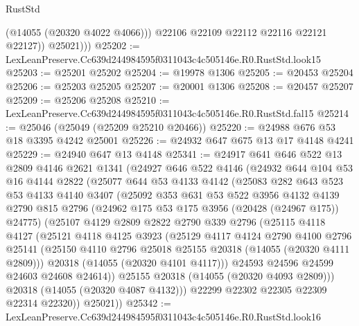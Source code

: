 \begin{lexlean}{RustStd}
\begin{coremodule}
                (@14055 (@20320 @4022 @4066)))
              @22106
              @22109
              @22112
              @22116
              @22121
              @22127))
          @25021)))
@25202 := LexLeanPreserve.Cc639d244984595f0311043c4c505146e.R0.RustStd.look15
@25203 := @25201 @25202
@25204 := @19978 @1306
@25205 := @20453 @25204
@25206 := @25203 @25205
@25207 := @20001 @1306
@25208 := @20457 @25207
@25209 := @25206 @25208
@25210 := LexLeanPreserve.Cc639d244984595f0311043c4c505146e.R0.RustStd.fal15
@25214 := @25046 (@25049 (@25209 @25210 @20466))
@25220 := @24988 @676 @53 @18 @3395 @4242 @25001
@25226 := @24932 @647 @675 @13 @17 @4148 @4241
@25229 := @24940 @647 @13 @4148
@25341 := @24917
    @641
    @646
    @522
    @13
    @2809
    @4146
    @2621
    @1341
    (@24927
      @646
      @522
      @4146
      (@24932
        @644
        @104
        @53
        @16
        @4144
        @2822
        (@25077
          @644
          @53
          @4133
          @4142
          (@25083
            @282
            @643
            @523
            @53
            @4133
            @4140
            @3407
            (@25092
              @353
              @631
              @53
              @522
              @3956
              @4132
              @4139
              @2790
              @815
              @2796
              (@24962 @175 @53 @175 @3956 (@20428 (@24967 @175)) @24775)
              (@25107
                @4129
                @2809
                @2822
                @2790
                @339
                @2796
                (@25115
                  @4118
                  @4127
                  (@25121
                    @4118
                    @4125
                    @3923
                    (@25129
                      @4117
                      @4124
                      @2790
                      @4100
                      @2796
                      @25141
                      (@25150 @4110 @2796 @25018 @25155 @20318 (@14055 (@20320 @4111 @2809)))
                      @20318
                      (@14055 (@20320 @4101 @4117)))
                    @24593
                    @24596
                    @24599
                    @24603
                    @24608
                    @24614))
                @25155
                @20318
                (@14055 (@20320 @4093 @2809)))
              @20318
              (@14055 (@20320 @4087 @4132)))
            @22299
            @22302
            @22305
            @22309
            @22314
            @22320))
        @25021))
@25342 := LexLeanPreserve.Cc639d244984595f0311043c4c505146e.R0.RustStd.look16

\end{coremodule}
\end{lexlean}
